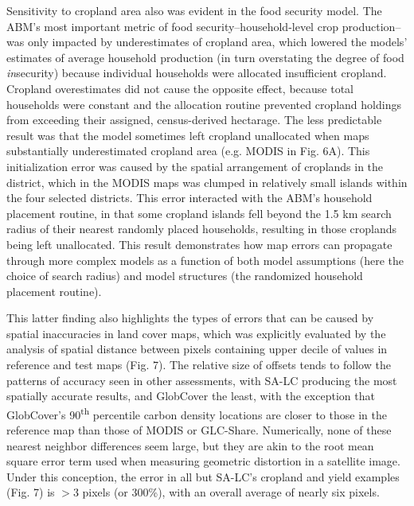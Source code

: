 \documentclass[12 pt, titlepage, a4paper]{article}
\begin{document}
Sensitivity to cropland area also was evident in the food security model. The ABM's most important metric of food security--household-level crop production--was only impacted by underestimates of cropland area, which lowered the models' estimates of average household production (in turn overstating the degree of food \emph{in}security) because individual households were allocated insufficient cropland. Cropland overestimates did not cause the opposite effect, because total households were constant and the allocation routine prevented cropland holdings from exceeding their assigned, census-derived hectarage. The less predictable result was that the model sometimes left cropland unallocated when maps substantially underestimated cropland area (e.g. MODIS in Fig. 6A). This initialization error was caused by the spatial arrangement of croplands in the district, which in the MODIS maps was clumped in relatively small islands within the four selected districts. This error interacted with the ABM's household placement routine, in that some cropland islands fell beyond the 1.5 km search radius of their nearest randomly placed households, resulting in those croplands being left unallocated. This result demonstrates how map errors can propagate through more complex models as a function of both model assumptions (here the choice of search radius) and model structures (the randomized household placement routine).

This latter finding also highlights the types of errors that can be caused by spatial inaccuracies in land cover maps, which was explicitly evaluated by the analysis of spatial distance between pixels containing upper decile of values in reference and test maps (Fig. 7).  The relative size of offsets tends to follow the patterns of accuracy seen in other assessments, with SA-LC producing the most spatially accurate results, and GlobCover the least, with the exception that GlobCover's 90\textsuperscript{th} percentile carbon density locations are closer to those in the reference map than those of MODIS or GLC-Share.  Numerically, none of these nearest neighbor differences seem large, but they are akin to the root mean square error term used when measuring geometric distortion in a satellite image. Under this conception, the error in all but SA-LC's cropland and yield examples (Fig. 7) is $>$3 pixels (or 300\%), with an overall average of nearly six pixels.  

\vspace{-0.3 cm}
\end{document}
